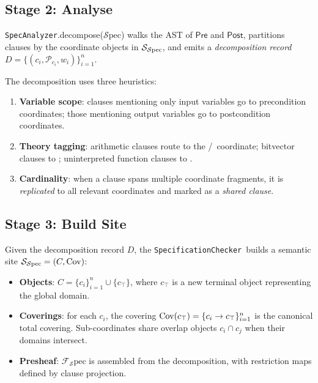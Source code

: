 \documentclass[11pt]{article}
\newcommand{\Spec}{\mathcal{S}\mathrm{pec}}        %
\newcommand{\Pre}{\ensuremath{\mathsf{Pre}}}                     %
\newcommand{\Post}{\ensuremath{\mathsf{Post}}}                   %
\newcommand{\Props}{\mathcal{P}}                    %
\newcommand{\CoordProps}[1]{\Props_{#1}}            %
\newcommand{\SatSite}{{\Site_{\Spec}}}                %
\newcommand{\SpecificationChecker}{\texttt{SpecificationChecker}}
\newcommand{\SpecAnalyzer}{\texttt{SpecAnalyzer}}
\begin{document}
\subsection{Stage 2: Analyse}\label{sec:analyse}

\SpecAnalyzer.decompose($\Spec$) walks the AST of $\Pre$ and $\Post$,
partitions clauses by the coordinate objects in $\SatSite$, and emits
a \emph{decomposition record} $D = \{(c_i, \CoordProps{c_i},
w_i)\}_{i=1}^n$.

The decomposition uses three heuristics:
\begin{enumerate}[leftmargin=2em,label=(\roman*)]
  \item \textbf{Variable scope}: clauses mentioning only input variables
        go to precondition coordinates; those mentioning output variables
        go to postcondition coordinates.
  \item \textbf{Theory tagging}: arithmetic clauses route to the
        \QFLIA/\QFLRA\ coordinate; bitvector clauses to \QFBV;
        uninterpreted function clauses to \QFUF.
  \item \textbf{Cardinality}: when a clause spans multiple coordinate
        fragments, it is \emph{replicated} to all relevant coordinates
        and marked as a \emph{shared clause}.
\end{enumerate}

\subsection{Stage 3: Build Site}\label{sec:build-site}

Given the decomposition record $D$, the \SpecificationChecker\ builds
a semantic site $\SatSite = (C, \Cov)$:
\begin{itemize}[leftmargin=2em]
  \item \textbf{Objects}: $C = \{c_i\}_{i=1}^n \cup \{c_\top\}$,
        where $c_\top$ is a new terminal object representing the
        global domain.
  \item \textbf{Coverings}: for each $c_i$, the covering
        $\mathrm{Cov}(c_\top) = \{c_i \to c_\top\}_{i=1}^n$ is the
        canonical total covering.
        Sub-coordinates share overlap objects $c_i \cap c_j$ when
        their domains intersect.
  \item \textbf{Presheaf}: $\mathcal{F}_\Spec$ is assembled from
        the decomposition, with restriction maps defined by
        clause projection.
\end{itemize}
\end{document}
